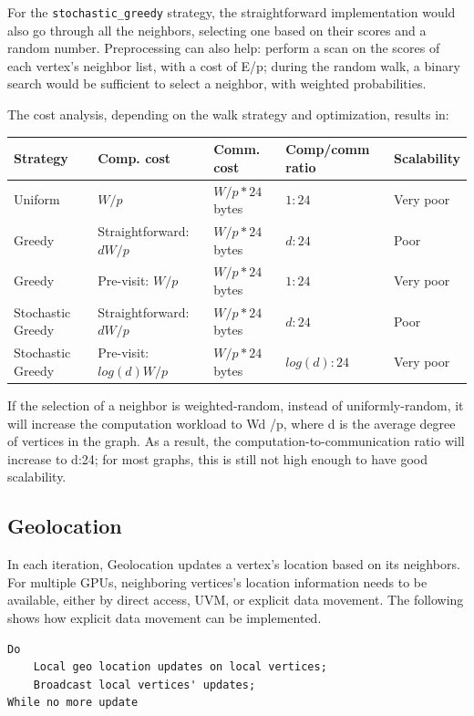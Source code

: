 \documentclass[10pt,oneside]{memoir}
\begin{document}
For the \texttt{stochastic\_greedy} strategy, the straightforward
implementation would also go through all the neighbors, selecting one
based on their scores and a random number. Preprocessing can also help:
perform a scan on the scores of each vertex's neighbor list, with a cost
of E/p; during the random walk, a binary search would be sufficient to
select a neighbor, with weighted probabilities.

The cost analysis, depending on the walk strategy and optimization,
results in:

\begin{longtable}[]{@{}lllll@{}}
\toprule
Strategy & Comp. cost & Comm. cost & Comp/comm ratio &
Scalability\tabularnewline
\midrule
\endhead
Uniform & \(W/p\) & \(W/p * 24\) bytes & \(1 : 24\) & Very
poor\tabularnewline
Greedy & Straightforward: \(dW/p\) & \(W/p * 24\) bytes & \(d : 24\) &
Poor\tabularnewline
Greedy & Pre-visit: \(W/p\) & \(W/p * 24\) bytes & \(1 : 24\) & Very
poor\tabularnewline
Stochastic Greedy & Straightforward: \(dW/p\) & \(W/p * 24\) bytes &
\(d : 24\) & Poor\tabularnewline
Stochastic Greedy & Pre-visit: \(log(d)W/p\) & \(W/p * 24\) bytes &
\(log(d) : 24\) & Very poor\tabularnewline
\bottomrule
\end{longtable}

If the selection of a neighbor is weighted-random, instead of
uniformly-random, it will increase the computation workload to Wd /p,
where d is the average degree of vertices in the graph. As a result, the
computation-to-communication ratio will increase to d:24; for most
graphs, this is still not high enough to have good scalability.

\hypertarget{geolocation-2}{%
\subsection{Geolocation}\label{geolocation-2}}

In each iteration, Geolocation updates a vertex's location based on its
neighbors. For multiple GPUs, neighboring vertices's location
information needs to be available, either by direct access, UVM, or
explicit data movement. The following shows how explicit data movement
can be implemented.

\begin{verbatim}
Do
    Local geo location updates on local vertices;
    Broadcast local vertices' updates;
While no more update
\end{verbatim}
\end{document}
